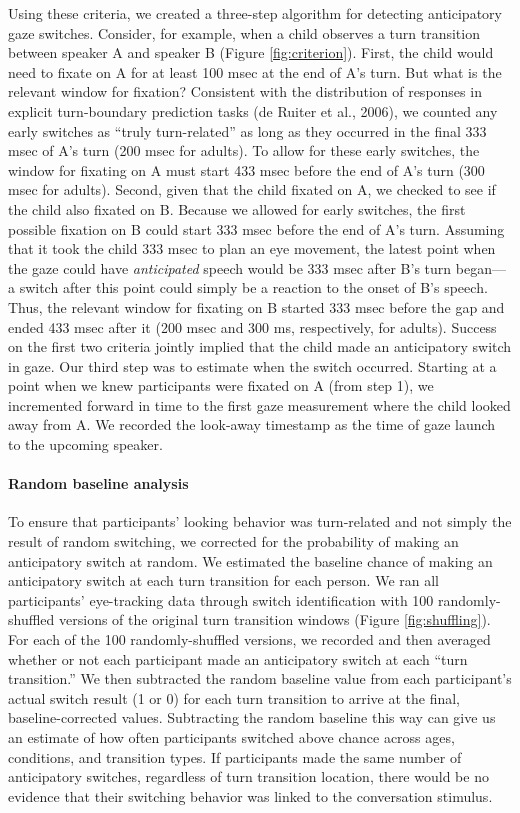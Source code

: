 \documentclass[authoryear, 12pt]{elsarticle}
\begin{document}
Using these criteria, we created a three-step algorithm for detecting anticipatory gaze switches. Consider, for example, when a child observes a turn transition between speaker A and speaker B (Figure \ref{fig:criterion}). First, the child would need to fixate on A for at least 100 msec at the end of A's turn. But what is the relevant window for fixation? Consistent with the distribution of responses in explicit turn-boundary prediction tasks (de Ruiter et al., 2006), we counted any early switches as ``truly turn-related'' as long as they occurred in the final 333 msec of A's turn (200 msec for adults). To allow for these early switches, the window for fixating on A must start 433 msec before the end of A's turn (300 msec for adults). Second, given that the child fixated on A, we checked to see if the child also fixated on B. Because we allowed for early switches, the first possible fixation on B could start 333 msec before the end of A's turn. Assuming that it took the child 333 msec to plan an eye movement, the latest point when the gaze could have \textit{anticipated} speech would be 333 msec after B's turn began---a switch after this point could simply be a reaction to the onset of B's speech. Thus, the relevant window for fixating on B started 333 msec before the gap and ended 433 msec after it (200 msec and 300 ms, respectively, for adults). Success on the first two criteria jointly implied that the child made an anticipatory switch in gaze. Our third step was to estimate when the switch occurred. Starting at a point when we knew participants were fixated on A (from step 1), we incremented forward in time to the first gaze measurement where the child looked away from A. We recorded the look-away timestamp as the time of gaze launch to the upcoming speaker.

\paragraph{Random baseline analysis} To ensure that participants' looking behavior was turn-related and not simply the result of random switching, we corrected for the probability of making an anticipatory switch at random. We estimated the baseline chance of making an anticipatory switch at each turn transition for each person. We ran all participants' eye-tracking data through switch identification with 100 randomly-shuffled versions of the original turn transition windows (Figure \ref{fig:shuffling}). For each of the 100 randomly-shuffled versions, we recorded and then averaged whether or not each participant made an anticipatory switch at each ``turn transition.'' We then subtracted the random baseline value from each participant's actual switch result (1 or 0) for each turn transition to arrive at the final, baseline-corrected values. Subtracting the random baseline this way can give us an estimate of how often participants switched above chance across ages, conditions, and transition types. If participants made the same number of anticipatory switches, regardless of turn transition location, there would be no evidence that their switching behavior was linked to the conversation stimulus. 
\end{document}
